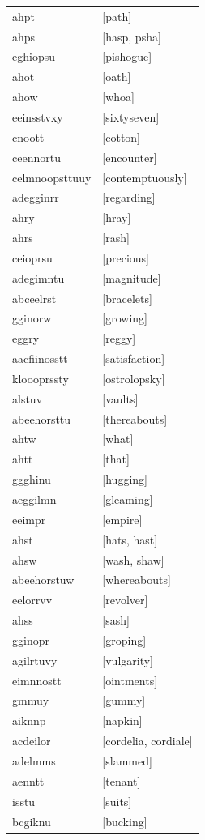 \documentclass{article}
\begin{document}
\begin{tabular}{ll}
ahpt & [path] \\
ahps & [hasp, psha] \\
eghiopsu & [pishogue] \\
ahot & [oath] \\
ahow & [whoa] \\
eeinsstvxy & [sixtyseven] \\
cnoott & [cotton] \\
ceennortu & [encounter] \\
celmnoopsttuuy & [contemptuously] \\
adegginrr & [regarding] \\
ahry & [hray] \\
ahrs & [rash] \\
ceioprsu & [precious] \\
adegimntu & [magnitude] \\
abceelrst & [bracelets] \\
gginorw & [growing] \\
eggry & [reggy] \\
aacfiinosstt & [satisfaction] \\
kloooprssty & [ostrolopsky] \\
alstuv & [vaults] \\
abeehorsttu & [thereabouts] \\
ahtw & [what] \\
ahtt & [that] \\
ggghinu & [hugging] \\
aeggilmn & [gleaming] \\
eeimpr & [empire] \\
ahst & [hats, hast] \\
ahsw & [wash, shaw] \\
abeehorstuw & [whereabouts] \\
eelorrvv & [revolver] \\
ahss & [sash] \\
gginopr & [groping] \\
agilrtuvy & [vulgarity] \\
eimnnostt & [ointments] \\
gmmuy & [gummy] \\
aiknnp & [napkin] \\
acdeilor & [cordelia, cordiale] \\
adelmms & [slammed] \\
aenntt & [tenant] \\
isstu & [suits] \\
bcgiknu & [bucking] \\

\end{tabular}
\end{document}
